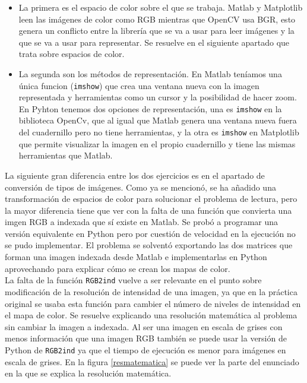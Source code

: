 \documentclass[a4paper,12pt]{report}
\begin{document}
\begin{itemize}
\item La primera es el espacio de color sobre el que se trabaja. Matlab y Matplotlib leen las imágenes de color como RGB mientras que OpenCV usa BGR, esto genera un conflicto entre la librería que se va a usar para leer imágenes y la que se va a usar para representar. Se resuelve en el siguiente apartado que trata sobre espacios de color.\\

\item La segunda son los métodos de representación. En Matlab teníamos una única funcion (\texttt{imshow}) que crea una ventana nueva con la imagen representada y herramientas como un cursor y la posibilidad de hacer zoom. En Pyhton tenemos dos opciones de representación, una es \texttt{imshow} en la biblioteca  OpenCv, que al igual que Matlab genera una ventana nueva fuera del cuadernillo pero no tiene herramientas, y la otra es \texttt{imshow} en Matplotlib que permite visualizar la imagen en el propio cuadernillo y tiene las mismas herramientas que Matlab.\\
\end{itemize}

La siguiente gran diferencia entre los dos ejercicios es en el apartado de conversión de tipos de imágenes. Como ya se mencionó, se ha añadido una transformación de espacios de color para solucionar el problema de lectura, pero la mayor diferencia tiene que ver con la falta de una función que convierta una imgen RGB a indexada que sí existe en Matlab. Se probó a programar una versión equivalente en Python pero por cuestión de velocidad en la ejecución no se pudo implementar. El problema se solventó exportando las dos matrices que forman una imagen indexada desde Matlab  e implementarlas en Python aprovechando para explicar cómo se crean los mapas de color.\\

La falta de la función \texttt{RGB2ind} vuelve a ser relevante en el punto sobre modificación de la resolución de intensidad de una imagen, ya que en la práctica original se usaba esta función para cambier el número de niveles de intensidad en el mapa de color. Se resuelve explicando una resolución matemática al problema sin cambiar la imagen a indexada. Al ser una imagen en escala de grises con menos información que una imagen RGB también se puede usar la versión de Python de \texttt{RGB2ind} ya que el tiempo de ejecución es menor para imágenes en escala de grises. En la figura \ref{resmatematica} se puede ver la parte del enunciado en la que se explica la resolución matemática. 
\end{document}
